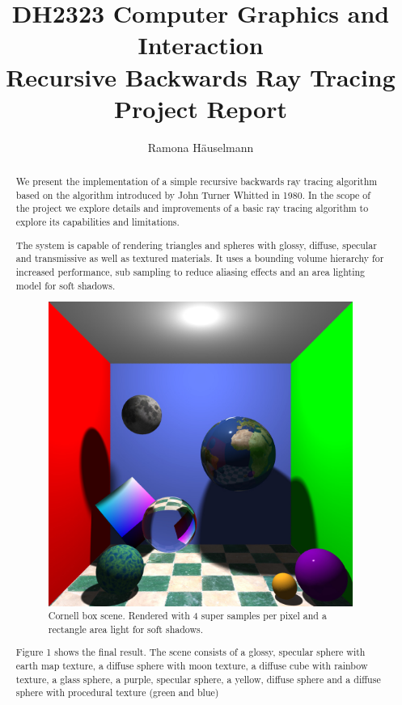 \documentclass[sigconf, nonacm]{acmart}
\begin{document}
\title{DH2323 Computer Graphics and Interaction \\ Recursive Backwards Ray Tracing \\ Project Report}

\author{Ramona Häuselmann}



\begin{abstract}
We present the implementation of a simple recursive backwards ray tracing algorithm based on the algorithm introduced by John Turner Whitted in 1980.
In the scope of the project we explore details and improvements of a basic ray tracing algorithm to explore its capabilities and limitations.

The system is capable of rendering triangles and spheres with glossy, diffuse, specular and transmissive as well as textured materials. It uses a
bounding volume hierarchy for increased performance, sub sampling to reduce aliasing effects and an area lighting model for soft shadows.
\begin{figure}[h]
  \centering
  \includegraphics[width=\linewidth]{figures/cornell_showcase.jpg}
  \caption{Cornell box scene. Rendered with 4 super samples per pixel and a rectangle area light for soft shadows.}
  \label{fig:cornell}
\end{figure}

Figure 1 shows the final result. The scene consists of a glossy, specular sphere with earth map texture, a diffuse sphere with moon texture,
a diffuse cube with rainbow texture, a glass sphere, a purple, specular sphere, a yellow, diffuse sphere and a diffuse sphere with procedural texture (green and blue)
\end{abstract}
\end{document}
